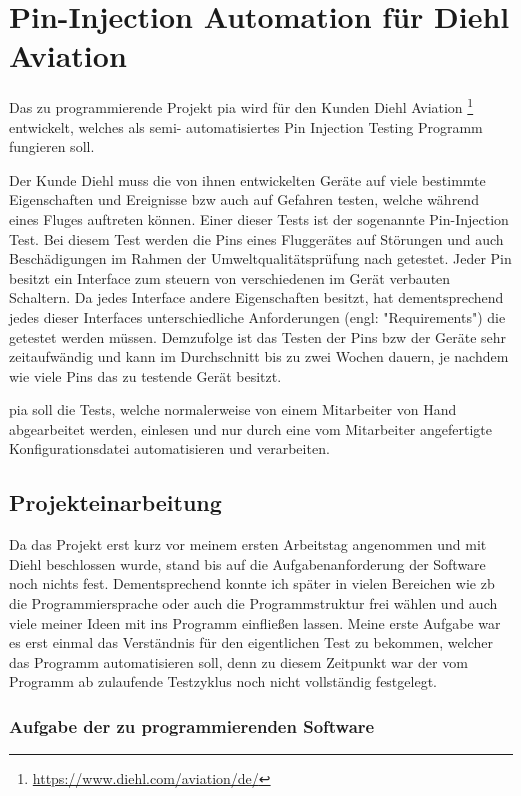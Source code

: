 \chapter{Pin-Injection Automation für Diehl Aviation}
\label{ch:pia}

Das zu programmierende Projekt \ac{pia} wird für den Kunden Diehl Aviation
\footnote{\url{https://www.diehl.com/aviation/de/}} entwickelt, welches als semi-
automatisiertes Pin Injection Testing Programm fungieren soll.

Der Kunde Diehl muss die von ihnen entwickelten Geräte auf viele bestimmte Eigenschaften und
Ereignisse \ac{bzw} auch auf Gefahren testen, welche während eines Fluges auftreten können.
Einer dieser Tests ist der sogenannte Pin-Injection Test.
Bei diesem Test werden die Pins eines Fluggerätes auf Störungen und auch Beschädigungen im
Rahmen der Umweltqualitätsprüfung nach \cite{DO-160} getestet. Jeder Pin besitzt ein Interface
zum steuern von verschiedenen im Gerät verbauten Schaltern. Da jedes Interface andere
Eigenschaften besitzt, hat dementsprechend jedes dieser Interfaces unterschiedliche
Anforderungen (engl: "Requirements") die getestet werden müssen.
Demzufolge ist das Testen der Pins \ac{bzw} der Geräte sehr zeitaufwändig und kann im
Durchschnitt bis zu zwei Wochen dauern, je nachdem wie viele Pins das zu testende Gerät
besitzt.

\ac{pia} soll die Tests, welche normalerweise von einem Mitarbeiter von Hand abgearbeitet
werden, einlesen und nur durch eine vom Mitarbeiter angefertigte Konfigurationsdatei
automatisieren und verarbeiten.


\section{Projekteinarbeitung}
\label{sec:prj-einarbeitung}

Da das Projekt erst kurz vor meinem ersten Arbeitstag angenommen und mit Diehl beschlossen
wurde, stand bis auf die Aufgabenanforderung der Software noch nichts fest. Dementsprechend
konnte ich später in vielen Bereichen wie \ac{zb} die Programmiersprache oder auch die
Programmstruktur frei wählen und auch viele meiner Ideen mit ins Programm einfließen lassen.
Meine erste Aufgabe war es erst einmal das Verständnis für den eigentlichen Test zu bekommen,
welcher das Programm automatisieren soll, denn zu diesem Zeitpunkt war der vom Programm
ab zulaufende Testzyklus noch nicht vollständig festgelegt. 


\subsection{Aufgabe der zu programmierenden Software}
\label{subsec:aufgabe-software}

